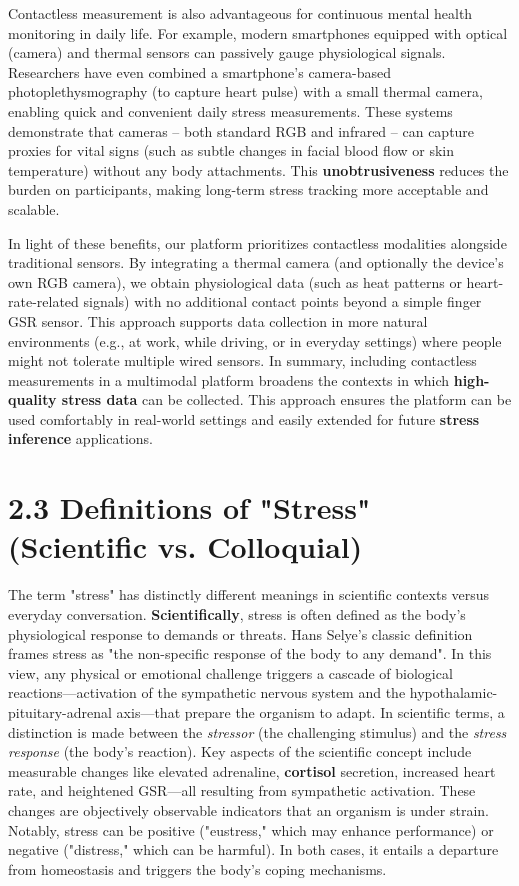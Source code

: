 Contactless measurement is also advantageous for continuous mental health monitoring in daily life. For example, modern smartphones equipped with optical (camera) and thermal sensors can passively gauge physiological signals. Researchers have even combined a smartphone's camera-based photoplethysmography (to capture heart pulse) with a small thermal camera, enabling quick and convenient daily stress measurements\cite{GSRFacialThermal2021}. These systems demonstrate that cameras – both standard RGB and infrared – can capture proxies for vital signs (such as subtle changes in facial blood flow or skin temperature) without any body attachments. This \textbf{unobtrusiveness} reduces the burden on participants, making long-term stress tracking more acceptable and scalable.

In light of these benefits, our platform prioritizes contactless modalities alongside traditional sensors. By integrating a thermal camera (and optionally the device's own RGB camera), we obtain physiological data (such as heat patterns or heart-rate-related signals) with no additional contact points beyond a simple finger GSR sensor. This approach supports data collection in more natural environments (e.g., at work, while driving, or in everyday settings) where people might not tolerate multiple wired sensors. In summary, including contactless measurements in a multimodal platform broadens the contexts in which \textbf{high-quality stress data} can be collected. This approach ensures the platform can be used comfortably in real-world settings and easily extended for future \textbf{stress inference} applications.

\section{2.3 Definitions of "Stress" (Scientific vs. Colloquial)}

The term "stress" has distinctly different meanings in scientific contexts versus everyday conversation. \textbf{Scientifically}, stress is often defined as the body's physiological response to demands or threats. Hans Selye's classic definition frames stress as "the non-specific response of the body to any demand"\cite{StressDefinitionHH}. In this view, any physical or emotional challenge triggers a cascade of biological reactions—activation of the sympathetic nervous system and the hypothalamic-pituitary-adrenal axis—that prepare the organism to adapt. In scientific terms, a distinction is made between the \textit{stressor} (the challenging stimulus) and the \textit{stress response} (the body's reaction). Key aspects of the scientific concept include measurable changes like elevated adrenaline, \textbf{cortisol} secretion, increased heart rate, and heightened GSR—all resulting from sympathetic activation\cite{CortisolStressIndicator2020}. These changes are objectively observable indicators that an organism is under strain. Notably, stress can be positive ("eustress," which may enhance performance) or negative ("distress," which can be harmful). In both cases, it entails a departure from homeostasis and triggers the body's coping mechanisms.


